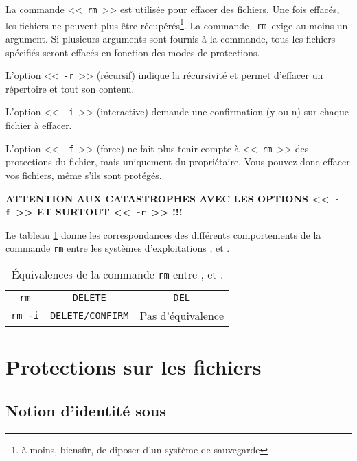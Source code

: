 La commande <<~{\tt rm}~>> est utilis{\'e}e pour effacer des fichiers. Une
fois effac{\'e}s, les fichiers ne peuvent plus {\^e}tre r{\'e}cup{\'e}r{\'e}s\footnote{{\`a}
moins, biens{\^u}r, de diposer d'un syst{\`e}me de sauvegarde}. La commande {\tt
rm }exige au moins un argument. Si plusieurs arguments sont fournis {\`a} la
commande, tous les fichiers sp{\'e}cifi{\'e}s seront effac{\'e}s en fonction des
modes de protections.

L'option <<~{\tt -r}~>> (r{\'e}cursif) indique la r{\'e}cursivit{\'e} et permet d'effacer un r{\'e}pertoire et tout son contenu.

L'option <<~{\tt -i}~>> (interactive) demande une confirmation (y ou n) sur chaque fichier {\`a} effacer.

L'option <<~{\tt -f}~>> (force) ne fait plus tenir compte {\`a} <<~{\tt rm}~>> des protections du fichier, mais uniquement du
propri{\'e}taire. Vous pouvez donc effacer vos fichiers, m{\^e}me s'ils sont prot{\'e}g{\'e}s.

\begin{center}
{\large
	{\bf
		ATTENTION AUX CATASTROPHES AVEC LES
		OPTIONS <<~{\tt -f}~>> ET SURTOUT <<~{\tt -r}~>> !!!
	}
}
\end{center}

Le tableau \ref{tab-cmds-equiv-rm} donne les correspondances des
diff{\'e}rents comportements de la commande {\tt rm} entre les syst{\`e}mes
d'exploitations {\Unix}, {\OpenVMS} et {\DOS}.

\begin{table}[hbtp]
\centering
\begin{tabular}{|c|c|c|}
	\hline
		{\Unix}			&	{\OpenVMS}		&	{\DOS}					\\
	\hline \hline
		{\tt rm}		&	{\tt DELETE}	&	{\tt DEL}				\\
		{\tt rm -i}		&	{\tt DELETE/CONFIRM}
											&	Pas d'{\'e}quivalence	\\
	\hline
\end{tabular}
\caption{\label{tab-cmds-equiv-rm}\'{E}quivalences de la commande
{\tt rm} entre {\Unix},{\OpenVMS} et {\DOS}.}
\end{table}

\section{\label{cmds-protect}Protections sur les fichiers}

\subsection{\label{cmds-unix-id}Notion d'identit{\'e} sous {\Unix}}

